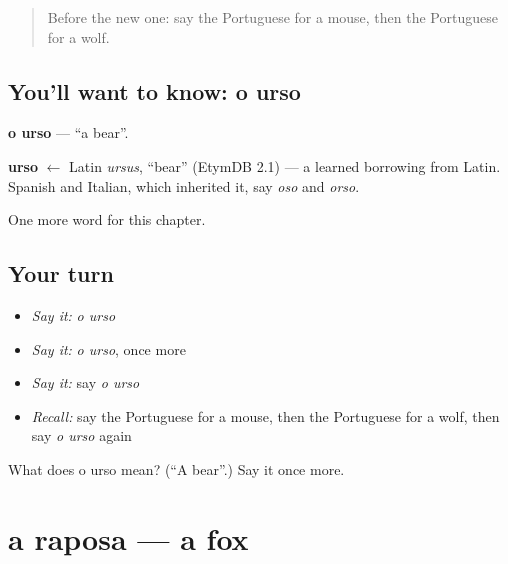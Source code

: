 \label{lesson:PT-C61-urso}



\begin{quote}
Before the new one: say the Portuguese for a mouse, then the Portuguese for a wolf.
\end{quote}

\subsection*{You'll want to know: o urso}
\textbf{o urso} — \textquotedblleft{}a bear\textquotedblright{}.

\begin{cousinweb}
\textbf{urso} $\leftarrow$ Latin \emph{ursus}, \textquotedblleft{}bear\textquotedblright{} (EtymDB 2.1) — a learned borrowing from Latin. Spanish and Italian, which inherited it, say \emph{oso} and \emph{orso}.
\end{cousinweb}

\begin{grammarlens}[title={What you've built}]
One more word for this chapter.
\end{grammarlens}

\subsection*{Your turn}
\begin{itemize}
\raggedright
  \item \emph{Say it:} \emph{o urso}
  \item \emph{Say it:} \emph{o urso}, once more
  \item \emph{Say it:} say \emph{o urso}
  \item \emph{Recall:} say the Portuguese for a mouse, then the Portuguese for a wolf, then say \emph{o urso} again
\end{itemize}

\begin{tcolorbox}[breakable,colback=teal!4,colframe=teal!35!black,title={Before you move on}]
What does o urso mean? (\textquotedblleft{}A bear\textquotedblright{}.) Say it once more.
\end{tcolorbox}
\section[a raposa]{a raposa — a fox}

\label{lesson:PT-C61-raposa}



